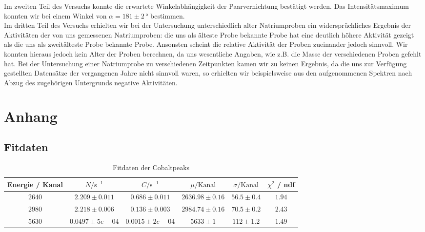 \documentclass[12pt,listof=totoc]{scrartcl}
\begin{document}
 Im zweiten Teil des Versuchs konnte die erwartete Winkelabhängigkeit der Paarvernichtung bestätigt werden. Das Intensitätsmaximum konnten wir bei einem Winkel von $\alpha=181\pm2\,°$ bestimmen.\\
 
 Im dritten Teil des Versuchs erhielten wir bei der Untersuchung unterschiedlich alter Natriumproben ein widersprüchliches Ergebnis der Aktivitäten der von uns gemessenen Natriumproben: die uns als älteste Probe bekannte Probe hat eine deutlich höhere Aktivität gezeigt als die uns als zweitälteste Probe bekannte Probe. Ansonsten scheint die relative Aktivität der Proben zueinander jedoch sinnvoll. Wir konnten hieraus jedoch kein Alter der Proben berechnen, da uns wesentliche Angaben, wie z.B. die Masse der verschiedenen Proben gefehlt hat.
 Bei der Untersuchung einer Natriumprobe zu verschiedenen Zeitpunkten kamen wir zu keinen Ergebnis, da die uns zur Verfügung gestellten Datensätze der vergangenen Jahre nicht sinnvoll waren, so erhielten wir beispielsweise aus den aufgenommenen Spektren nach Abzug des zugehörigen Untergrunds negative Aktivitäten.
 

\newpage
\listoffigures
\listoftables


\newpage
\section{Anhang}
\subsection{Fitdaten}

\begin{table}[h!]
	\footnotesize\centering
	\begin{tabular}{|c||c|c|c|c||c|}
		\hline
		Energie / Kanal&$N/\mathrm{s^{-1}}$&$C/\mathrm{s^{-1}}$&$\mu/\mathrm{Kanal}$&$\sigma/\mathrm{Kanal}$&$\chi^2$ / ndf\\\hline\hline2640&$2.209\pm0.011$&$0.686\pm0.011$&$2636.98\pm0.16$&$56.5\pm0.4$&$1.94$\\
		2980&$2.218\pm0.006$&$0.136\pm0.003$&$2984.74\pm0.16$&$70.5\pm0.2$&$2.43$\\
		5630&$0.0497\pm5e-04$&$0.0015\pm2e-04$&$5633\pm1$&$112\pm1.2$&$1.49$\\
		\hline\end{tabular}
	\caption{Fitdaten der Cobaltpeaks\label{cobalttable}}
\end{table}
\end{document}
